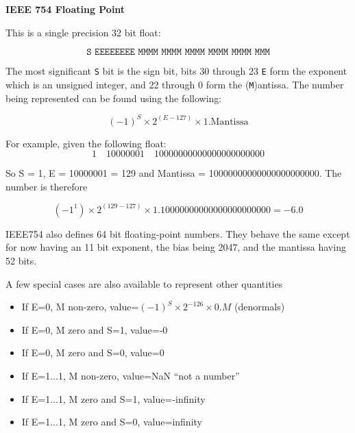\documentclass[10pt]{article}
\begin{document}
\begin{definition}
	\textbf{IEEE 754 Floating Point}

	This is a single precision 32 bit float:

	\begin{equation}
		\texttt{S  EEEEEEEE  MMMM MMMM MMMM MMMM MMMM MMM}
	\end{equation}
	

	The most significant \texttt{S} bit is the sign bit, bits 30 through 23 \texttt{E} form the exponent which is an unsigned integer, and 22 through 0 form the (\texttt{M})antissa. The number being represented can be found using the following:

	\begin{equation}
	(-1)^S \times 2 ^ {(E-127)} \times 1.\text{Mantissa}
		\label{eq:352:float32_eq}
	\end{equation}

	\begin{example}
		For example, given the following float:
		\begin{equation*}
			1\quad10000001\quad10000000000000000000000
		\end{equation*}
		
		So S = 1, E = 10000001 = 129 and Mantissa = 10000000000000000000000.
		The number is therefore

		\begin{equation}
			(-1^1) \times 2^{(129-127)} \times 1.10000000000000000000000 = -6.0
		\end{equation}
	\end{example}


	IEEE754 also defines 64 bit floating-point numbers. They behave the same except for now having an 11 bit exponent, the bias being 2047, and the mantissa having 52 bits.


	A few special cases are also available to represent other quantities

	\begin{itemize}
	\item If E=0, M non-zero, value=$(-1)^S \times 2^{-126} \times 0.M$ (denormals)
		\item If E=0, M zero and S=1, value=-0
		\item If E=0, M zero and S=0, value=0
		\item If E=1...1, M non-zero, value=NaN “not a number”
		\item If E=1...1, M zero and S=1, value=-infinity
		\item If E=1...1, M zero and S=0, value=infinity
	\end{itemize}


\end{definition}
\end{document}
